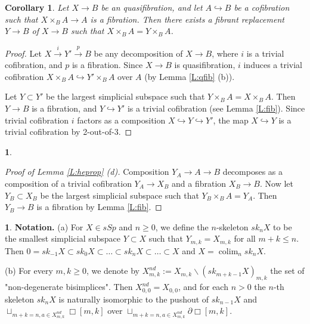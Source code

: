 \documentclass[12pt]{amsart}
\theoremstyle{plain}
\newtheorem{Cor}[Thm]{Corollary}
\theoremstyle{definition}
\newtheorem{Emp}[Thm]{}
\numberwithin{equation}{section}
\newcommand{\lra}{\longrightarrow}
\newcommand{\hra}{\hookrightarrow}
\newcommand{\rl}[1]{Lemma \ref{L:#1}}
\newcommand{\re}[1]{\ref{E:#1}}
\newcommand{\sm}{\smallsetminus}
\newcommand{\p}{\partial}
\newcommand{\colim}{\operatorname{colim}}
\begin{document}
\begin{Cor} \label{C:almost1}
Let $X\to B$ be an quasifibration, and let $A\hra B$ be a
cofibration such that $X\times_B A\to A$ is a fibration. Then
there exists a fibrant replacement $Y\to B$ of $X\to B$ such that
$X\times_B A=Y\times_B A$.
\end{Cor}

\begin{proof}
Let $X\overset{i}{\lra} Y'\overset{p}{\lra} B$ be any
decomposition of $X\to B$, where $i$ is a trivial cofibration, and
$p$ is a fibration. Since $X\to B$ is quasifibration, $i$ induces
a trivial cofibration $X\times_B A\hra  Y'\times_B A$ over $A$ (by
\rl{qfib} (b)).

Let $Y\subset Y'$ be the largest simplicial subspace such that
$Y\times_B A= X\times_B A$. Then $Y\to B$ is a fibration, and 
$Y\hra Y'$ is a trivial cofibration (see \rl{fib}). Since trivial
cofibration $i$ factors as  a composition $X\hra Y\hra Y'$, the
map $X\hra Y$ is a trivial cofibration by 2-out-of-3.
\end{proof}

\begin{Emp} \label{E:pfhepropd}
\begin{proof}[Proof of \rl{heprop} (d)]
Composition $Y_A\to A\to B$ decomposes as a composition of a
trivial cofibration $Y_A\to X_B$ and a fibration $X_B\to B$. Now
let $Y_B\subset X_B$ be the largest simplicial subspace such that
$Y_B\times_B A=Y_A$. Then $Y_B\to B$ is a fibration by \rl{fib}.
\end{proof}
\end{Emp}

\begin{Emp} \label{E:skel2}
{\bf Notation.} (a) For $X\in sSp$ and $n\geq 0$, we define
the $n$-skeleton $sk_n X$ to be the smallest simplicial subspace
$Y\subset X$ such that $Y_{m,k}=X_{m,k}$ for all $m+k\leq n$. Then
$0=sk_{-1} X\subset sk_0 X\subset \ldots \subset sk_n
X\subset\ldots \subset X$ and $X=\colim_n sk_n X$.

(b) For every $m,k\geq 0$, we denote by $X_{m,k}^{nd}:=X_{m,k}\sm
(sk_{m+k-1}X)_{m,k}$ the set of "non-degenerate bisimplices". Then
$X_{0,0}^{nd}=X_{0,0}$, and for each $n>0$ the $n$-th skeleton
$sk_n X$ is naturally isomorphic to the pushout of  $sk_{n-1} X$
and $\sqcup_{m+k=n, a\in X_{m,k}^{nd}}\Box[m,k]$ over
$\sqcup_{m+k=n, a\in X_{m,k}^{nd}}\p\Box[m,k]$.

\end{Emp}
\end{document}

